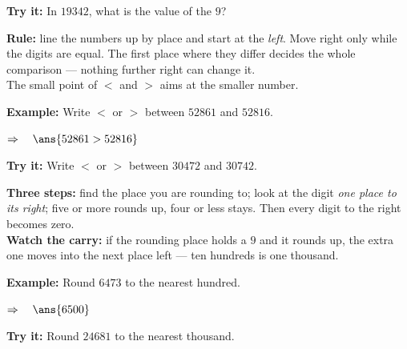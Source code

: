 \documentclass[12pt]{article}
\begin{document}
\begin{tryitbox}
\textbf{Try it:} In $19342$, what is the value of the $9$?\\[2pt]
\end{tryitbox}


\begin{formulabox}
\textbf{Rule:} line the numbers up by place and start at the \emph{left}. Move
right only while the digits are equal. The first place where they differ
decides the whole comparison --- nothing further right can change it.\\[3pt]
The small point of $<$ and $>$ aims at the smaller number.
\end{formulabox}

\begin{examplebox}
\textbf{Example:} Write $<$ or $>$ between $52861$ and $52816$.

$\Rightarrow\quad \ans{52861 > 52816}$
\end{examplebox}

\begin{tryitbox}
\textbf{Try it:} Write $<$ or $>$ between $30472$ and $30742$.\\[2pt]
\end{tryitbox}


\begin{formulabox}
\textbf{Three steps:} find the place you are rounding to; look at the digit
\emph{one place to its right}; five or more rounds up, four or less stays.
Then every digit to the right becomes zero.\\[3pt]
\textbf{Watch the carry:} if the rounding place holds a $9$ and it rounds up,
the extra one moves into the next place left --- ten hundreds is one thousand.
\end{formulabox}

\begin{examplebox}
\textbf{Example:} Round $6473$ to the nearest hundred.

$\Rightarrow\quad \ans{6500}$
\end{examplebox}

\begin{tryitbox}
\textbf{Try it:} Round $24681$ to the nearest thousand.\\[2pt]
\end{tryitbox}
\end{document}
